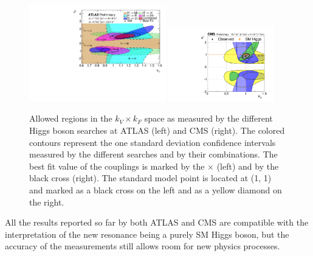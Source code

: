 \begin{figure}
        \centering
	\includegraphics[width=0.53\textwidth]{1_Introduction_Th_and_Exp/pics/fig_05b.pdf}
	\includegraphics[width=0.41\textwidth]{1_Introduction_Th_and_Exp/pics/cVcF_all_channels_2quadrant.pdf}
       \caption{Allowed regions in the $k_V \times k_F$ space as measured by the different Higgs boson searches at ATLAS (left) and CMS (right). The colored contours represent the one standard deviation confidence intervals measured by the different searches and by their combinations. The best fit value of the couplings is marked by the $\times$ (left) and by the black cross (right). The standard model point is located at (1, 1) and marked as a black cross on the left and as a yellow diamond on the right. }
       \label{fig:kvf}
\end{figure}

All the results reported so far by both ATLAS and CMS are compatible with the interpretation of the new resonance being a purely SM Higgs boson, but the accuracy of the measurements still allows room for new physics processes.




